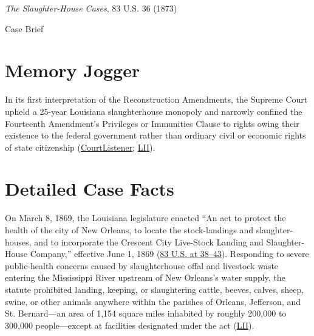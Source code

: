 \documentclass[12pt]{article}
\begin{document}
\begin{center}
{\LARGE \textit{The Slaughter-House Cases}, 83 U.S. 36 (1873)\par}
\vspace{0.8em}
{\large Case Brief\par}
\end{center}
\vspace{1em}

\section{Memory Jogger}

In its first interpretation of the Reconstruction Amendments, the Supreme Court upheld a 25-year Louisiana slaughterhouse monopoly and narrowly confined the Fourteenth Amendment's Privileges or Immunities Clause to rights owing their existence to the federal government rather than ordinary civil or economic rights of state citizenship (\href{https://www.courtlistener.com/opinion/88661/butchers-benevolent-assn-v-crescent-city-live-stock-landing/}{CourtListener}; \href{https://www.law.cornell.edu/supremecourt/text/83/36}{LII}).

\section{Detailed Case Facts}

On March 8, 1869, the Louisiana legislature enacted ``An act to protect the health of the city of New Orleans, to locate the stock-landings and slaughter-houses, and to incorporate the Crescent City Live-Stock Landing and Slaughter-House Company,'' effective June 1, 1869 (\href{https://www.law.cornell.edu/supremecourt/text/83/36}{83 U.S. at 38--43}). Responding to severe public-health concerns caused by slaughterhouse offal and livestock waste entering the Mississippi River upstream of New Orleans's water supply, the statute prohibited landing, keeping, or slaughtering cattle, beeves, calves, sheep, swine, or other animals anywhere within the parishes of Orleans, Jefferson, and St. Bernard---an area of 1,154 square miles inhabited by roughly 200,000 to 300,000 people---except at facilities designated under the act (\href{https://www.law.cornell.edu/supremecourt/text/83/36}{LII}).
\end{document}

